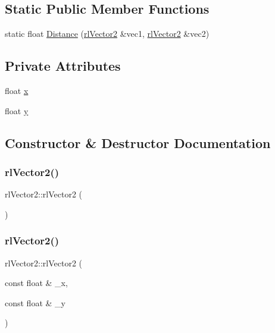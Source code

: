 \subsection*{Static Public Member Functions}
\begin{DoxyCompactItemize}
\item 
static float \hyperlink{classrl_vector2_a39d2b451c7e62031a5accbffd09f79c1}{Distance} (\hyperlink{classrl_vector2}{rl\+Vector2} \&vec1, \hyperlink{classrl_vector2}{rl\+Vector2} \&vec2)
\end{DoxyCompactItemize}
\subsection*{Private Attributes}
\begin{DoxyCompactItemize}
\item 
float \hyperlink{classrl_vector2_aaa61c10d3c6f5f5822b110290bea14de}{x}
\item 
float \hyperlink{classrl_vector2_a67f900eef0c9312627966b51dc72571b}{y}
\end{DoxyCompactItemize}


\subsection{Constructor \& Destructor Documentation}
\mbox{\label{classrl_vector2_ad24b73b97ca9d284c1b844cdff2005ec}} 
\subsubsection{\texorpdfstring{rl\+Vector2()}{rlVector2()}\hspace{0.1cm}{\footnotesize\ttfamily [1/2]}}
{\footnotesize\ttfamily rl\+Vector2\+::rl\+Vector2 (\begin{DoxyParamCaption}{ }\end{DoxyParamCaption})}

\mbox{\label{classrl_vector2_ac3dca75f3619925b2e7ddc33de1581f4}} 
\subsubsection{\texorpdfstring{rl\+Vector2()}{rlVector2()}\hspace{0.1cm}{\footnotesize\ttfamily [2/2]}}
{\footnotesize\ttfamily rl\+Vector2\+::rl\+Vector2 (\begin{DoxyParamCaption}\item[{const float \&}]{\+\_\+x,  }\item[{const float \&}]{\+\_\+y }\end{DoxyParamCaption})}

